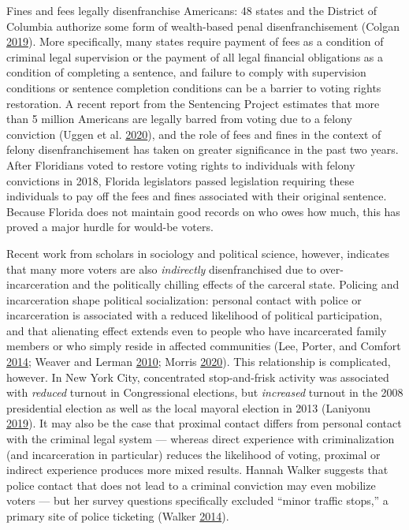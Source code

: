\documentclass[
  12pt,
]{article}
\begin{document}
Fines and fees legally disenfranchise Americans: 48 states and the District of Columbia authorize some form of wealth-based penal disenfranchisement (Colgan \protect\hyperlink{ref-Colgan2019}{2019}). More specifically, many states require payment of fees as a condition of criminal legal supervision or the payment of all legal financial obligations as a condition of completing a sentence, and failure to comply with supervision conditions or sentence completion conditions can be a barrier to voting rights restoration. A recent report from the Sentencing Project estimates that more than 5 million Americans are legally barred from voting due to a felony conviction (Uggen et al. \protect\hyperlink{ref-Uggen2020}{2020}), and the role of fees and fines in the context of felony disenfranchisement has taken on greater significance in the past two years. After Floridians voted to restore voting rights to individuals with felony convictions in 2018, Florida legislators passed legislation requiring these individuals to pay off the fees and fines associated with their original sentence. Because Florida does not maintain good records on who owes how much, this has proved a major hurdle for would-be voters.

Recent work from scholars in sociology and political science, however, indicates that many more voters are also \emph{indirectly} disenfranchised due to over-incarceration and the politically chilling effects of the carceral state. Policing and incarceration shape political socialization: personal contact with police or incarceration is associated with a reduced likelihood of political participation, and that alienating effect extends even to people who have incarcerated family members or who simply reside in affected communities (Lee, Porter, and Comfort \protect\hyperlink{ref-Lee2014}{2014}; Weaver and Lerman \protect\hyperlink{ref-Weaver2010}{2010}; Morris \protect\hyperlink{ref-Morris2020}{2020}). This relationship is complicated, however. In New York City, concentrated stop-and-frisk activity was associated with \emph{reduced} turnout in Congressional elections, but \emph{increased} turnout in the 2008 presidential election as well as the local mayoral election in 2013 (Laniyonu \protect\hyperlink{ref-Laniyonu2019}{2019}). It may also be the case that proximal contact differs from personal contact with the criminal legal system --- whereas direct experience with criminalization (and incarceration in particular) reduces the likelihood of voting, proximal or indirect experience produces more mixed results. Hannah Walker suggests that police contact that does not lead to a criminal conviction may even mobilize voters --- but her survey questions specifically excluded ``minor traffic stops,'' a primary site of police ticketing (Walker \protect\hyperlink{ref-Walker2014}{2014}).
\end{document}
